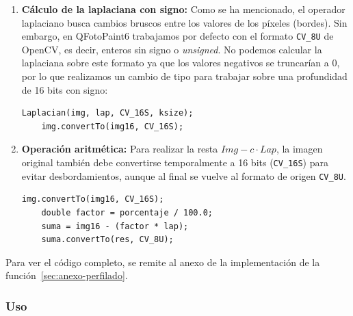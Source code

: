 \documentclass[11pt]{article}
\begin{document}
          \begin{enumerate}
              \item \textbf{Cálculo de la laplaciana con signo:}
                    Como se ha mencionado, el operador laplaciano busca cambios bruscos entre los valores de los píxeles (bordes). Sin embargo, en QFotoPaint6 trabajamos por defecto con el formato \texttt{CV\_8U} de OpenCV, es decir, enteros sin signo o \textit{unsigned}. No podemos calcular la laplaciana sobre este formato ya que los valores negativos se truncarían a 0, por lo que realizamos un cambio de tipo para trabajar sobre una profundidad de 16 bits con signo:

                    \begin{lstlisting}[style=CppQtStyle, caption={Cálculo de la Laplaciana y conversión a \texttt{CV\_16S} (fragmento).}, label={lst:imagenes-mc}]
    Laplacian(img, lap, CV_16S, ksize);
    img.convertTo(img16, CV_16S);
\end{lstlisting}

              \item \textbf{Operación aritmética:}
                    Para realizar la resta $Img - c \cdot Lap$, la imagen original también debe convertirse temporalmente a 16 bits (\texttt{CV\_16S}) para evitar desbordamientos, aunque al final se vuelve al formato de origen \texttt{CV\_8U}.

                    \begin{lstlisting}[style=CppQtStyle, caption={Conversión a \texttt{CV\_16S} y suma aritmética para evitar desbordamientos (fragmento).}, label={lst:imagenes-mc}]
    img.convertTo(img16, CV_16S);
    double factor = porcentaje / 100.0;
    suma = img16 - (factor * lap);
    suma.convertTo(res, CV_8U);
\end{lstlisting}
          \end{enumerate}

          \noindent
          Para ver el código completo, se remite al anexo de la implementación de la
          función~\ref{sec:anexo-perfilado}.

      \subsubsection{Uso}
\end{document}
